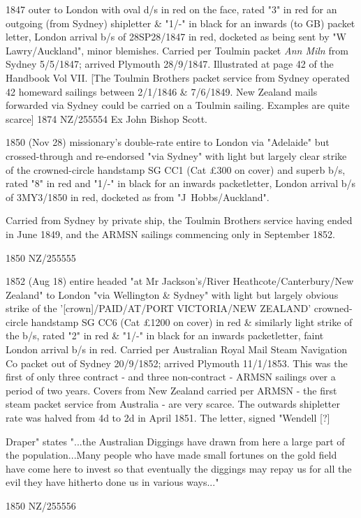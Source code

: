 \documentclass[justified]{tufte-book}
\begin{document}
%
{1847 outer to London with oval  d/s in red on the face, rated "3" in red for an outgoing (from Sydney) shipletter \& "1/-" in black for an inwards (to GB) packet letter, London arrival b/s of 28SP28/1847 in red, docketed as being sent by "W Lawry/Auckland", minor blemishes. Carried per Toulmin packet \textit{Ann Miln} from Sydney 5/5/1847; arrived Plymouth 28/9/1847. 
Illustrated at page 42 of the Handbook Vol VII. 
[The Toulmin Brothers packet service from Sydney operated 42 homeward sailings between 2/1/1846 \& 7/6/1849. New Zealand mails forwarded via Sydney could be carried on a Toulmin sailing. Examples are quite scarce]}%
{1874}%
{NZ/255554}%
{Ex John Bishop Scott.}%
{}
{}%
{}%


%
{1850 (Nov 28) missionary's double-rate entire to London via "Adelaide" but crossed-through and re-endorsed "via Sydney" with light but largely clear strike of the  crowned-circle handstamp SG CC1 (Cat \pounds300 on cover) and superb  b/s, rated "8" in red and "1/-" in black for an inwards packetletter, London arrival b/s of 3MY3/1850 in red, docketed as from "J~Hobbs/Auckland". 

Carried from Sydney by private ship, the Toulmin Brothers service having ended in June 1849, and the ARMSN sailings commencing only in September 1852.
}%
{1850}%
{NZ/255555}%
{}%
{}
{}%
{}%

%
{1852 (Aug 18) entire headed "at Mr Jackson's/River Heathcote/Canterbury/New Zealand" to London "via Wellington \& Sydney" with light but largely obvious strike of the '[crown]/PAID/AT/PORT VICTORIA/NEW ZEALAND' crowned- circle handstamp SG CC6 (Cat £1200 on cover) in red \& similarly light strike of the  b/s, rated "2" in red \& "1/-" in black for an inwards packetletter, faint London arrival b/s in red. Carried per Australian Royal Mail Steam Navigation Co packet  out of Sydney 20/9/1852; arrived Plymouth 11/1/1853. This was the first of only three contract - and three non-contract - ARMSN sailings over a period of two years. Covers from New Zealand carried per ARMSN - the first steam packet service from Australia - are very scarce. The outwards shipletter rate was halved from 4d to 2d in April 1851. The letter, signed "Wendell [?] 

Draper" states "...the Australian Diggings have drawn from here a large part of the population...Many people who have made small fortunes on the gold field have come here to invest so that eventually the diggings may repay us for all the evil they have hitherto done us in various ways..."}%
{1850}%
{NZ/255556}%
{}%
{}
{}%
{}%
\end{document}
